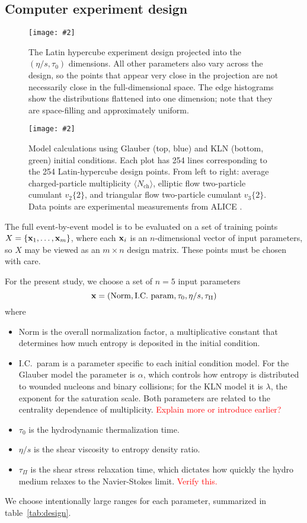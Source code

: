 \documentclass[aps,prc,reprint,amsmath]{revtex4-1}
\newcommand{\todo}[1]{\textcolor{red}{#1}}
\newcommand{\colfig}[3][t]{
  \begin{figure}[#1]
    \texttt{[image: \#2]}
    \caption{\label{fig:#2}#3}
  \end{figure}
}
\newcommand{\widefig}[3][t]{
  \begin{figure*}[#1]
    \texttt{[image: \#2]}
    \caption{\label{fig:#2}#3}
  \end{figure*}
}
\newcommand{\avg}[1]{\langle #1 \rangle}
\newcommand{\nch}{N_\text{ch}}
\newcommand{\vnk}[2]{v_#1\{#2\}}
\begin{document}
\subsection{Computer experiment design}

\colfig[b]{design}{
  The Latin hypercube experiment design projected into the $(\eta/s, \tau_0)$ dimensions.
  All other parameters also vary across the design, so the points that appear very close in the projection are not necessarily close in the full-dimensional space.
  The edge histograms show the distributions flattened into one dimension; note that they are space-filling and approximately uniform.
}

\widefig{prior_draws}{
  Model calculations using Glauber (top, blue) and KLN (bottom, green) initial conditions.
  Each plot has 254 lines corresponding to the 254 Latin-hypercube design points.
  From left to right:
  average charged-particle multiplicity $\avg\nch$,
  elliptic flow two-particle cumulant $\vnk 2 2$,
  and triangular flow two-particle cumulant $\vnk 3 2$.
  Data points are experimental measurements from ALICE \cite{Abelev:2014mda}.
}

The full event-by-event model is to be evaluated on a set of training points $X = \{\mathbf x_1, \ldots, \mathbf x_m\}$, where each $\mathbf x_i$ is an $n$-dimensional vector of input parameters, so $X$ may be viewed as an $m \times n$ design matrix.
These points must be chosen with care.

For the present study, we choose a set of $n = 5$ input parameters
\begin{equation}
  \mathbf x = (\text{Norm}, \text{I.C.\ param}, \tau_0, \eta/s, \tau_\Pi)
\end{equation}
where
\begin{itemize}
  \item Norm is the overall normalization factor, a multiplicative constant that determines how much entropy is deposited in the initial condition.
  \item I.C.\ param is a parameter specific to each initial condition model.
    For the Glauber model the parameter is $\alpha$, which controls how entropy is distributed to wounded nucleons and binary collisions;
    for the KLN model it is $\lambda$, the exponent for the saturation scale.
    Both parameters are related to the centrality dependence of multiplicity.
    \todo{Explain more or introduce earlier?}
  \item $\tau_0$ is the hydrodynamic thermalization time.
  \item $\eta/s$ is the shear viscosity to entropy density ratio.
  \item $\tau_\Pi$ is the shear stress relaxation time, which dictates how quickly the hydro medium relaxes to the Navier-Stokes limit.
    \todo{Verify this.}
\end{itemize}
We choose intentionally large ranges for each parameter, summarized in table~\ref{tab:design}.
\end{document}
